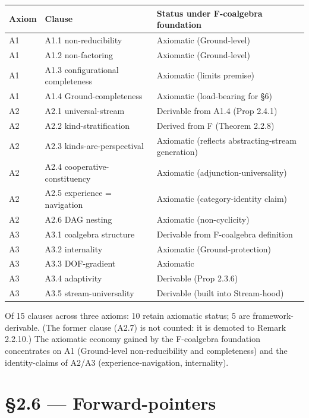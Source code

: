 \documentclass[11pt, openany]{book}
\newcommand{\sectionbreak}{\clearpage}
\begin{document}
\begingroup\setlength{\tabcolsep}{3pt}\renewcommand{\arraystretch}{1.15}\footnotesize
\begin{longtable}{p{0.55in} p{1.50in} p{2.28in}}
\toprule
Axiom & Clause & Status under F-coalgebra foundation \\
\midrule
\endhead
\bottomrule
\endfoot
A1 & A1.1 non-reducibility & Axiomatic (Ground-level) \\
\midrule
A1 & A1.2 non-factoring & Axiomatic (Ground-level) \\
\midrule
A1 & A1.3 configurational completeness & Axiomatic (limits premise) \\
\midrule
A1 & A1.4 Ground-completeness & Axiomatic (load-bearing for §6) \\
\midrule
A2 & A2.1 universal-stream & Derivable from A1.4 (Prop 2.4.1) \\
\midrule
A2 & A2.2 kind-stratification & Derived from F (Theorem 2.2.8) \\
\midrule
A2 & A2.3 kinds-are-perspectival & Axiomatic (reflects abstracting-stream generation) \\
\midrule
A2 & A2.4 cooperative-constituency & Axiomatic (adjunction-universality) \\
\midrule
A2 & A2.5 experience = navigation & Axiomatic (category-identity claim) \\
\midrule
A2 & A2.6 DAG nesting & Axiomatic (non-cyclicity) \\
\midrule
A3 & A3.1 coalgebra structure & Derivable from F-coalgebra definition \\
\midrule
A3 & A3.2 internality & Axiomatic (Ground-protection) \\
\midrule
A3 & A3.3 DOF-gradient & Axiomatic \\
\midrule
A3 & A3.4 adaptivity & Derivable (Prop 2.3.6) \\
\midrule
A3 & A3.5 stream-universality & Derivable (built into Stream-hood) \\
\bottomrule
\end{longtable}
\endgroup
Of 15 clauses across three axioms: 10 retain axiomatic status; 5 are framework-derivable. (The former clause (A2.7) is not counted: it is demoted to Remark 2.2.10.) The axiomatic economy gained by the F-coalgebra foundation concentrates on A1 (Ground-level non-reducibility and completeness) and the identity-claims of A2/A3 (experience-navigation, internality).

\sectionbreak

\section{§2.6 --- Forward-pointers}
\end{document}
